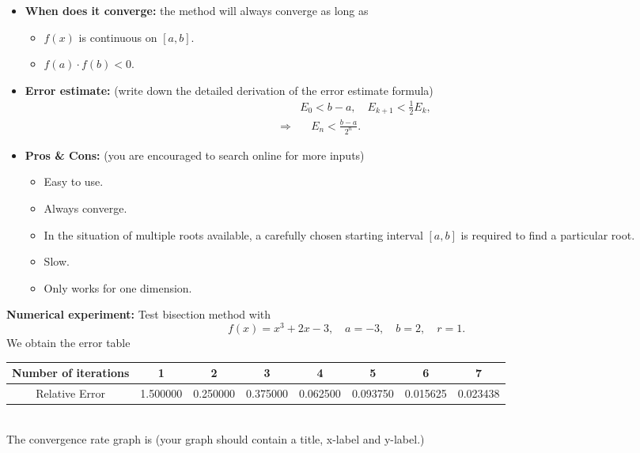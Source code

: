 \documentclass{article}
\begin{document}
	\begin{itemize}
		\item{\bf When does it converge:} the method will always converge as long as
		\begin{itemize}
			\item $f(x)$ is continuous on $[a,b]$.
			\item $f(a)\cdot f(b)<0$.
		\end{itemize}
		\item {\bf Error estimate:} (write down the detailed derivation of the error estimate formula)
		\begin{equation}
		\begin{split}
		& E_0  < b-a,\quad
		E_{k+1}  < \frac{1}{2}E_k,\\
		\Rightarrow&\quad E_n <\frac{b-a}{2^n}.
		\end{split}
		\end{equation}
		\item {\bf Pros \& Cons:} (you are encouraged to search online for more inputs)
		\begin{itemize}
			\item Easy to use.
			\item Always converge.
			\item In the situation of multiple roots available, a carefully chosen starting interval $[a,b]$ is required to find a particular root.
			\item Slow.
			\item Only works for one dimension.
		\end{itemize}
	\end{itemize}
	{\bf Numerical experiment:}
	Test bisection method with 
	$$
	f(x) = x^3+2x-3,\quad a = -3, \quad b= 2,\quad r = 1.
	$$
	We obtain the error table\\[0.1in]
	\begin{tabular}{|c|c|c|c|c|c|c|c|}
		\hline
		Number of iterations & 1 & 2 & 3 & 4 & 5 & 6 & 7\\
		\hline
		Relative Error & 1.500000  & 0.250000  & 0.375000 & 
		0.062500  & 0.093750 & 0.015625 & 0.023438\\
		\hline
	\end{tabular}
	\\[0.1in]
	The convergence rate graph is (your graph should contain
	a title, x-label and y-label.)
\end{document}
